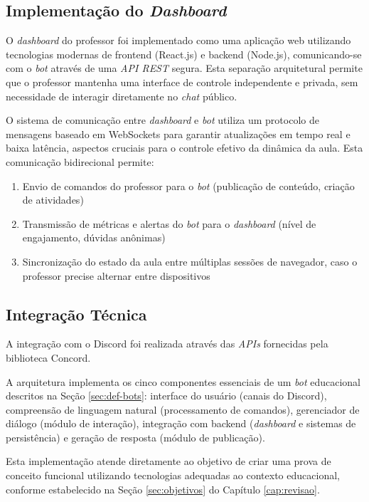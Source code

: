 \subsection{Implementação do \textit{Dashboard}}

O \textit{dashboard} do professor foi implementado como uma aplicação web
utilizando tecnologias modernas de frontend (React.js) e backend (Node.js),
comunicando-se com o \textit{bot} através de uma \textit{API REST} segura. Esta
separação arquitetural permite que o professor mantenha uma interface de
controle independente e privada, sem necessidade de interagir diretamente no
\textit{chat} público.

O sistema de comunicação entre \textit{dashboard} e \textit{bot} utiliza um
protocolo de mensagens baseado em WebSockets para garantir atualizações em tempo
real e baixa latência, aspectos cruciais para o controle efetivo da dinâmica da
aula. Esta comunicação bidirecional permite:

\begin{enumerate}
\item Envio de comandos do professor para o \textit{bot} (publicação de
conteúdo, criação de atividades)
\item Transmissão de métricas e alertas do \textit{bot} para o
\textit{dashboard} (nível de engajamento, dúvidas anônimas)
\item Sincronização do estado da aula entre múltiplas sessões de navegador, caso
o professor precise alternar entre dispositivos
\end{enumerate}

\subsection{Integração Técnica}

A integração com o Discord foi realizada através das \textit{APIs} fornecidas
pela biblioteca Concord.

A arquitetura implementa os cinco componentes essenciais de um \textit{bot}
educacional descritos na Seção \ref{sec:def-bots}: interface do usuário (canais
do Discord), compreensão de linguagem natural (processamento de comandos),
gerenciador de diálogo (módulo de interação), integração com backend
(\textit{dashboard} e sistemas de persistência) e geração de resposta (módulo de
publicação).

Esta implementação atende diretamente ao objetivo de criar uma prova de conceito
funcional utilizando tecnologias adequadas ao contexto educacional, conforme
estabelecido na Seção \ref{sec:objetivos} do Capítulo \ref{cap:revisao}.

